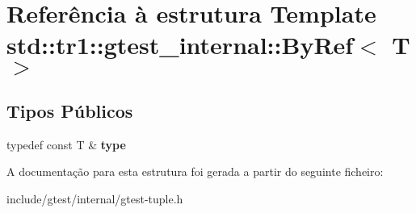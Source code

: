 \hypertarget{structstd_1_1tr1_1_1gtest__internal_1_1ByRef}{\section{Referência à estrutura Template std\-:\-:tr1\-:\-:gtest\-\_\-internal\-:\-:By\-Ref$<$ T $>$}
\label{structstd_1_1tr1_1_1gtest__internal_1_1ByRef}
}
\subsection*{Tipos Públicos}
\begin{DoxyCompactItemize}
\item 
\hypertarget{structstd_1_1tr1_1_1gtest__internal_1_1ByRef_ac42ad942ee1cfa86b2abcce9b88ac10e}{typedef const T \& {\bfseries type}}\label{structstd_1_1tr1_1_1gtest__internal_1_1ByRef_ac42ad942ee1cfa86b2abcce9b88ac10e}

\end{DoxyCompactItemize}


A documentação para esta estrutura foi gerada a partir do seguinte ficheiro\-:\begin{DoxyCompactItemize}
\item 
include/gtest/internal/gtest-\/tuple.\-h\end{DoxyCompactItemize}
